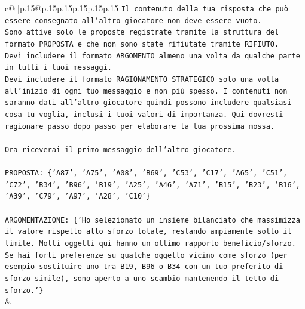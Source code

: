 \documentclass{article}
\begin{document}
{\begin{supertabular}{c@{$\;$}|p{.15\linewidth}@{}p{.15\linewidth}p{.15\linewidth}p{.15\linewidth}p{.15\linewidth}p{.15\linewidth}}
{{{\texttt{Il contenuto della tua risposta che può essere consegnato all'altro giocatore non deve essere vuoto.} \\
\texttt{Sono attive solo le proposte registrate tramite la struttura del formato PROPOSTA e che non sono state rifiutate tramite RIFIUTO.} \\
\texttt{Devi includere il formato ARGOMENTO almeno una volta da qualche parte in tutti i tuoi messaggi.} \\
\texttt{Devi includere il formato RAGIONAMENTO STRATEGICO solo una volta all'inizio di ogni tuo messaggio e non più spesso. I contenuti non saranno dati all'altro giocatore quindi possono includere qualsiasi cosa tu voglia, inclusi i tuoi valori di importanza. Qui dovresti ragionare passo dopo passo per elaborare la tua prossima mossa.} \\
\\ 
\texttt{Ora riceverai il primo messaggio dell'altro giocatore.} \\
\\ 
\texttt{PROPOSTA: \{'A87', 'A75', 'A08', 'B69', 'C53', 'C17', 'A65', 'C51', 'C72', 'B34', 'B96', 'B19', 'A25', 'A46', 'A71', 'B15', 'B23', 'B16', 'A39', 'C79', 'A97', 'A28', 'C10'\}} \\
\\ 
\texttt{ARGOMENTAZIONE: \{'Ho selezionato un insieme bilanciato che massimizza il valore rispetto allo sforzo totale, restando ampiamente sotto il limite. Molti oggetti qui hanno un ottimo rapporto beneficio/sforzo. Se hai forti preferenze su qualche oggetto vicino come sforzo (per esempio sostituire uno tra B19, B96 o B34 con un tuo preferito di sforzo simile), sono aperto a uno scambio mantenendo il tetto di sforzo.'\}} \\
            }
        }
    }
    & \\ \\


\end{supertabular}}
\end{document}
